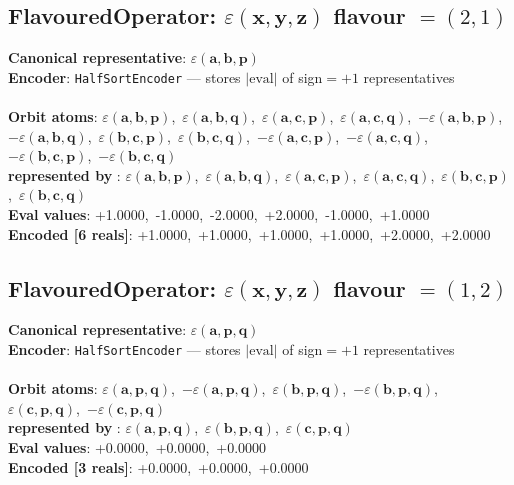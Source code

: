 \documentclass[a4paper,11pt]{article}
\newcommand{\kblbmcpggoncpf}[3]{\varepsilon(\mathbf{#1},\mathbf{#2},\mathbf{#3})}
\begin{document}
\subsection{FlavouredOperator: $\kblbmcpggoncpf{x}{y}{z}$  flavour $= (2, 1)$}
\textbf{  Canonical representative}: $\displaystyle\kblbmcpggoncpf{a}{b}{p}$\\
\textbf{  Encoder}: \texttt{HalfSortEncoder} — stores $|\text{eval}|$ of sign$=+1$ representatives\\\\
\textbf{  Orbit atoms}: $\kblbmcpggoncpf{a}{b}{p}$,\ $\kblbmcpggoncpf{a}{b}{q}$,\ $\kblbmcpggoncpf{a}{c}{p}$,\ $\kblbmcpggoncpf{a}{c}{q}$,\ $-\kblbmcpggoncpf{a}{b}{p}$,\ $-\kblbmcpggoncpf{a}{b}{q}$,\ $\kblbmcpggoncpf{b}{c}{p}$,\ $\kblbmcpggoncpf{b}{c}{q}$,\ $-\kblbmcpggoncpf{a}{c}{p}$,\ $-\kblbmcpggoncpf{a}{c}{q}$,\ $-\kblbmcpggoncpf{b}{c}{p}$,\ $-\kblbmcpggoncpf{b}{c}{q}$\\
\textbf{  represented by }: $\kblbmcpggoncpf{a}{b}{p}$,\ $\kblbmcpggoncpf{a}{b}{q}$,\ $\kblbmcpggoncpf{a}{c}{p}$,\ $\kblbmcpggoncpf{a}{c}{q}$,\ $\kblbmcpggoncpf{b}{c}{p}$,\ $\kblbmcpggoncpf{b}{c}{q}$\\
\textbf{  Eval values}: +1.0000,\ -1.0000,\ -2.0000,\ +2.0000,\ -1.0000,\ +1.0000\\
\textbf{  Encoded [6 reals]}: +1.0000,\ +1.0000,\ +1.0000,\ +1.0000,\ +2.0000,\ +2.0000\\

\subsection{FlavouredOperator: $\kblbmcpggoncpf{x}{y}{z}$  flavour $= (1, 2)$}
\textbf{  Canonical representative}: $\displaystyle\kblbmcpggoncpf{a}{p}{q}$\\
\textbf{  Encoder}: \texttt{HalfSortEncoder} — stores $|\text{eval}|$ of sign$=+1$ representatives\\\\
\textbf{  Orbit atoms}: $\kblbmcpggoncpf{a}{p}{q}$,\ $-\kblbmcpggoncpf{a}{p}{q}$,\ $\kblbmcpggoncpf{b}{p}{q}$,\ $-\kblbmcpggoncpf{b}{p}{q}$,\ $\kblbmcpggoncpf{c}{p}{q}$,\ $-\kblbmcpggoncpf{c}{p}{q}$\\
\textbf{  represented by }: $\kblbmcpggoncpf{a}{p}{q}$,\ $\kblbmcpggoncpf{b}{p}{q}$,\ $\kblbmcpggoncpf{c}{p}{q}$\\
\textbf{  Eval values}: +0.0000,\ +0.0000,\ +0.0000\\
\textbf{  Encoded [3 reals]}: +0.0000,\ +0.0000,\ +0.0000\\
\end{document}
